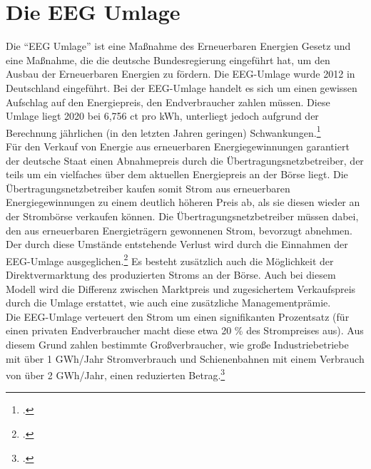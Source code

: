 \section{Die EEG Umlage}
Die \enquote{EEG Umlage} ist eine Maßnahme des Erneuerbaren Energien Gesetz und eine Maßnahme, die die deutsche Bundesregierung eingeführt hat, um den Ausbau der Erneuerbaren Energien zu fördern.
Die EEG-Umlage wurde 2012 in Deutschland eingeführt. 
Bei der EEG-Umlage handelt es sich um einen gewissen Aufschlag auf den Energiepreis, den Endverbraucher zahlen müssen.
Diese Umlage liegt 2020 bei 6,756 ct pro kWh, unterliegt jedoch aufgrund der Berechnung jährlichen (in den letzten Jahren geringen) Schwankungen.\footcite[Vgl.][]{Netztransparenz2020}\\
Für den Verkauf von Energie aus erneuerbaren Energiegewinnungen garantiert der deutsche Staat einen Abnahmepreis durch die Übertragungsnetzbetreiber, der teils um ein vielfaches über dem aktuellen Energiepreis an der Börse liegt.
Die Übertragungsnetzbetreiber kaufen somit Strom aus erneuerbaren Energiegewinnungen zu einem deutlich höheren Preis ab, als sie diesen wieder an der Strombörse verkaufen können. 
Die Übertragungsnetzbetreiber müssen dabei, den aus erneuerbaren Energieträgern gewonnenen Strom, bevorzugt abnehmen.
Der durch diese Umstände entstehende Verlust wird durch die Einnahmen der EEG-Umlage ausgeglichen.\footcite[Vgl. auch im Folgenden][]{Bundesnetzagentur2020}
Es besteht zusätzlich auch die Möglichkeit der Direktvermarktung des produzierten Stroms an der Börse. Auch bei diesem Modell wird die Differenz zwischen Marktpreis und zugesichertem Verkaufspreis durch die Umlage erstattet, wie auch eine zusätzliche Managementprämie.
\\
Die EEG-Umlage verteuert den Strom um einen signifikanten Prozentsatz (für einen privaten Endverbraucher macht diese etwa 20 \% des Strompreises aus). 
Aus diesem Grund zahlen bestimmte Großverbraucher, wie große Industriebetriebe mit über 1 GWh/Jahr Stromverbrauch und Schienenbahnen mit einem Verbrauch von über 2 GWh/Jahr, einen reduzierten Betrag.\footcite[Vgl.][]{Bundesnetzagentur2020}